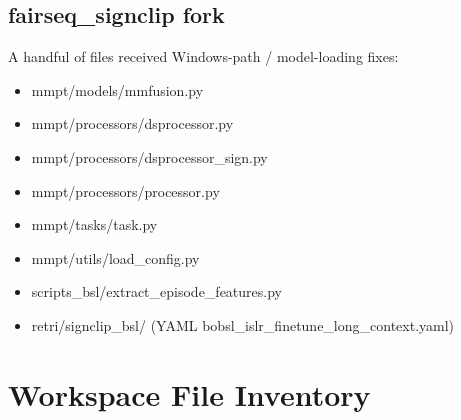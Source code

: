 \documentclass[11pt,a4paper]{article}
\def\texttt#1{#1}%
\begin{document}
\subsection{fairseq\_signclip fork}
A handful of files received Windows-path / model-loading fixes:
\begin{itemize}[leftmargin=1.5em,itemsep=0pt]
  \item \texttt{mmpt/models/mmfusion.py}
  \item \texttt{mmpt/processors/dsprocessor.py}
  \item \texttt{mmpt/processors/dsprocessor\_sign.py}
  \item \texttt{mmpt/processors/processor.py}
  \item \texttt{mmpt/tasks/task.py}
  \item \texttt{mmpt/utils/load\_config.py}
  \item \texttt{scripts\_bsl/extract\_episode\_features.py}
  \item \texttt{retri/signclip\_bsl/} (YAML
        \texttt{bobsl\_islr\_finetune\_long\_context.yaml})
\end{itemize}

\section{Workspace File Inventory}
\end{document}
